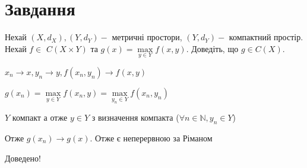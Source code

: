 
\chapter{Завдання \theHchapter}

\begin{tcolorbox}[title=Завдання]
    Нехай $\left(X, d_{X}\right),\left(Y, d_{Y}\right)-$ метричні простори, 
    $\left(Y, d_{Y}\right)-$ компактний простір. 
    Нехай $f \in$ $C(X \times Y)$ та 
    $g(x)=\max\limits _{y \in Y} f(x, y)$. 
    Доведіть, що $g \in C(X)$.
\end{tcolorbox}



$x_n \rightarrow x, y_n \rightarrow y, 
f(x_n, y_n) \rightarrow f(x, y)$


$g(x_n) = \max\limits_{y \in Y}f(x_n, y) = 
\max\limits_{y_n \in Y}f(x_n, y_n)$


$Y$ компакт а отже $y \in Y$ з визначення компакта 
($\forall n \in \mathbb{N}, y_n \in Y$)


Отже $g(x_n) \rightarrow g(x)$. Отже є неперервною за Ріманом

Доведено!
